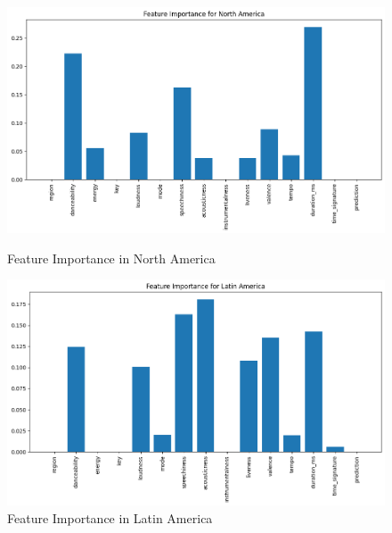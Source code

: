 \begin{figure}[h]
    \centering
    \begin{minipage}{0.45\textwidth}
        \centering
        \includegraphics[width=\linewidth]{media/dt_feat_imp_north_amer.png}
        \caption{Feature Importance in North America}
    \end{minipage}%
    \hspace{0.05\textwidth} %
    \begin{minipage}{0.45\textwidth}
        \centering
        \includegraphics[width=\linewidth]{media/dt_feature_importance_lat_america.png}
        \caption{Feature Importance in Latin America}
    \end{minipage}
\end{figure}

